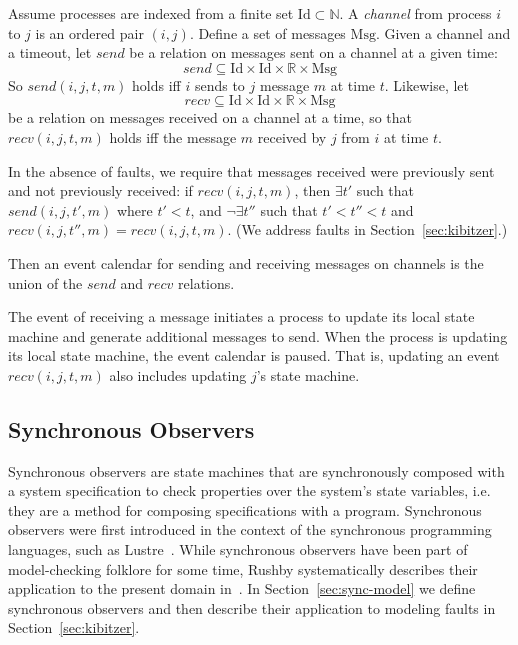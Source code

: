 \documentclass{llncs/llncs}
\newcommand{\Id}{\ensuremath{\mathrm{Id}}}
\newcommand{\Msg}{\ensuremath{\mathrm{Msg}}}
\newcommand{\lee}[1]{ } %
\newcommand{\lee}[1]{ {\color{blue}$<$lee: #1$>$} } %
\begin{document}
Assume processes are indexed from a finite set $\Id \subset \mathbb{N}$. A \emph{channel} from process $i$ to $j$ is an ordered pair $(i,j)$. Define a set of messages $\Msg$. Given a channel and a timeout, let $send$ be a relation on messages sent on a channel at a given time:
$$send \subseteq \Id \times \Id \times \mathbb{R} \times \Msg$$
So $send(i, j, t, m)$ holds iff $i$ sends to $j$ message $m$ at time $t$. Likewise, let
$$recv \subseteq \Id \times \Id \times \mathbb{R} \times \Msg$$
be a relation on messages received on a channel at a time, so that $recv(i, j, t, m)$ holds iff the message $m$ received by $j$ from $i$ at time $t$.

In the absence of faults, we require that messages received were previously sent and not previously received: if $recv(i, j, t, m)$, then $\exists t'$ such that $send(i, j, t', m)$ where $t' < t$, and $\neg\exists t''$ such that $t' < t'' < t$ and $recv(i, j, t'', m) = recv(i, j, t, m)$. (We address faults in Section~\ref{sec:kibitzer}.)

Then an event calendar for sending and receiving messages on channels is the union of the $send$ and $recv$ relations.

\lee{technically, atomic time is just a convenience.}
The event of receiving a message initiates a process to update its local state machine and generate additional messages to send. When the process is updating its local state machine, the event calendar is paused. That is, updating an event $recv(i, j, t, m)$ also includes updating $j$'s state machine.

\lee{note that we don't need full generality of send and receive events in OM(1)}

\lee{note that we use calendar automata for non real-time system}

\subsection{Synchronous Observers}\label{sec:sync}
Synchronous observers are state machines that are synchronously composed with a system specification to check properties over the system's state variables, i.e. they are a method for composing specifications with a program. Synchronous observers were first introduced in the context of the synchronous programming languages, such as Lustre~\cite{lustre:ieee}. While synchronous observers have been part of model-checking folklore for some time, Rushby systematically describes their application to the present domain in~\cite{Rushby:SAS14}. In Section~\ref{sec:sync-model} we define synchronous observers and then describe their application to modeling faults in Section~\ref{sec:kibitzer}.
\end{document}
